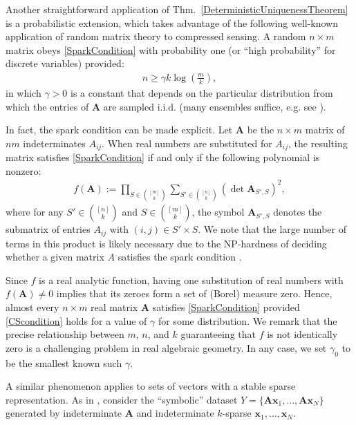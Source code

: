\documentclass[9pt,twocolumn]{pnas-new}
\begin{document}
Another straightforward application of Thm.~\ref{DeterministicUniquenessTheorem} is a probabilistic extension, which takes advantage of the following well-known application of random matrix theory to compressed sensing.  A random $n \times m$ matrix obeys \eqref{SparkCondition} with probability one (or ``high probability'' for discrete variables) 
provided:
\begin{align}\label{CScondition}
n \geq \gamma k\log\left(\frac{m}{k}\right),
\end{align}
in which $\gamma >0$ is a constant that depends on the particular distribution from which the entries of $\mathbf{A}$ are sampled i.i.d. (many ensembles suffice, e.g. see \cite[Sec.~4]{Baraniuk08}). 

In fact, 
the spark condition can be made explicit.  Let $\mathbf{A}$  be the $n \times m$ matrix of $nm$ indeterminates $A_{ij}$. When real numbers are substituted for $A_{ij}$, the resulting matrix satisfies \eqref{SparkCondition} if and only if the following polynomial is nonzero:
\begin{align*}
f(\mathbf{A}) := \prod_{S \in {[m] \choose k}} \sum_{S' \in {[n] \choose k}} (\det \mathbf{A}_{S',S})^2,
\end{align*}
%
where for any $S' \in {[n] \choose k}$ and $S \in {[m] \choose k}$, the symbol $\mathbf{A}_{S',S}$ denotes the submatrix of entries $A_{ij}$ with $(i,j) \in S' \times S$.   We note that the large number of terms in this product is likely necessary due to the NP-hardness of deciding whether a given matrix $A$ satisfies the spark condition \cite{tillmann2014computational}.

Since $f$ is a real analytic function, having one substitution of real numbers with $f(\mathbf{A}) \neq 0$ implies that its zeroes form a set of (Borel) measure zero. Hence, almost every $n \times m$ real matrix $\mathbf{A}$ satisfies \eqref{SparkCondition} provided \eqref{CScondition} holds for a value of $\gamma$ for some distribution. We remark that the precise relationship between $m$, $n$, and $k$ guaranteeing that $f$ is not identically zero is a challenging problem in real algebraic geometry. In any case, we set $\gamma_0$ to be the smallest known such $\gamma$.

A similar phenomenon applies to sets of vectors with a stable sparse representation. As in \cite[Sec.~IV]{Hillar15}, consider the ``symbolic'' dataset $Y = \{\mathbf{A}\mathbf{x}_1,\ldots,\mathbf{A} \mathbf{x}_N\}$ generated by indeterminate $\mathbf{A}$ and indeterminate $k$-sparse $\mathbf{x}_1, \ldots, \mathbf{x}_N$.  
\end{document}
